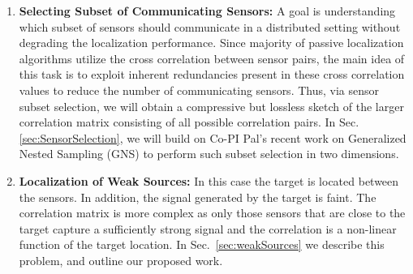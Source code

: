 \begin{enumerate}
\item {\bf Selecting Subset of Communicating Sensors:} A goal  is understanding which subset of sensors should communicate  in a distributed setting without degrading the localization performance. Since majority of passive localization algorithms utilize the cross correlation between sensor pairs, the main idea of this task is to exploit inherent redundancies present in these cross correlation values to reduce the number of communicating sensors. Thus, via sensor subset selection, we will obtain a compressive but lossless sketch of the larger correlation matrix consisting of all possible correlation pairs. In Sec. \ref{sec:SensorSelection}, we will build on Co-PI Pal's recent work on Generalized Nested Sampling (GNS) to perform such subset selection in two dimensions.
\item {\bf Localization of Weak Sources:}  In this case the target is located between the sensors. In addition, the signal generated by the target is faint. The correlation matrix is more complex as only those sensors that are close to the target capture a sufficiently strong signal and the correlation is a non-linear function of the target location. In Sec.~\ref{sec:weakSources} we describe  this problem, and outline our proposed work.

\end{enumerate}

